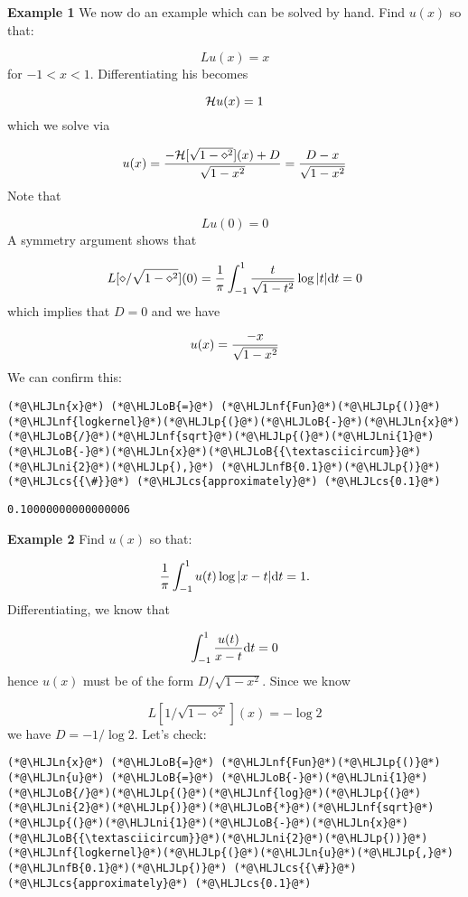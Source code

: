 \documentclass[12pt,landscape]{article}
\newcommand{\HLJLn}[1]{#1}
\newcommand{\HLJLnf}[1]{\textcolor[RGB]{66,102,213}{#1}}
\newcommand{\HLJLnfB}[1]{\textcolor[RGB]{59,151,46}{#1}}
\newcommand{\HLJLni}[1]{\textcolor[RGB]{59,151,46}{#1}}
\newcommand{\HLJLoB}[1]{\textcolor[RGB]{102,102,102}{\textbf{#1}}}
\newcommand{\HLJLp}[1]{#1}
\newcommand{\HLJLcs}[1]{\textcolor[RGB]{153,153,119}{\textit{#1}}}
\def\D{ {\rm d} }
\def\HH{ {\cal H} }
\def\dt{\D t}
\begin{document}
{\textbf{Example 1} We now do an example which can be solved by hand. Find $u(x)$ so that:

\[
L u(x) = x
\]
for $-1 < x < 1$. Differentiating his becomes

\[
\HH u(x) = 1
\]
which we solve via

\[
u(x) = {- \HH[\sqrt{1-\diamond^2}](x) + D \over \sqrt{1-x^2}} = {D-x \over \sqrt{1-x^2}}
\]
Note that

\[
L u(0) = 0
\]
A symmetry argument shows that

\[
L [\diamond/\sqrt{1-\diamond^2}](0) = {1 \over \pi} \int_{-1}^1 {t \over \sqrt{1-t^2}} \log|t| \D t = 0
\]
which implies that $D = 0$ and we have

\[
u(x) = {-x \over \sqrt{1-x^2}}
\]
We can confirm this:


\begin{lstlisting}
(*@\HLJLn{x}@*) (*@\HLJLoB{=}@*) (*@\HLJLnf{Fun}@*)(*@\HLJLp{()}@*)
(*@\HLJLnf{logkernel}@*)(*@\HLJLp{(}@*)(*@\HLJLoB{-}@*)(*@\HLJLn{x}@*)(*@\HLJLoB{/}@*)(*@\HLJLnf{sqrt}@*)(*@\HLJLp{(}@*)(*@\HLJLni{1}@*)(*@\HLJLoB{-}@*)(*@\HLJLn{x}@*)(*@\HLJLoB{{\textasciicircum}}@*)(*@\HLJLni{2}@*)(*@\HLJLp{),}@*) (*@\HLJLnfB{0.1}@*)(*@\HLJLp{)}@*) (*@\HLJLcs{{\#}}@*) (*@\HLJLcs{approximately}@*) (*@\HLJLcs{0.1}@*)
\end{lstlisting}

\begin{lstlisting}
0.10000000000000006
\end{lstlisting}


\textbf{Example 2} Find $u(x)$ so that:

\[
{1 \over \pi} \int_{-1}^1 u(t) \log | x-t| \dt = 1.
\]
Differentiating, we know that

\[
\int_{-1}^1 {u(t) \over x-t} \dt = 0
\]
hence $u(x)$ must be of the form ${D / \sqrt{1-x^2}}$.  Since we know

\[
L[{1 /\sqrt{1-\diamond^2}}](x) = - \log 2
\]
we have $D = -1/\log 2$. Let's check:


\begin{lstlisting}
(*@\HLJLn{x}@*) (*@\HLJLoB{=}@*) (*@\HLJLnf{Fun}@*)(*@\HLJLp{()}@*)
(*@\HLJLn{u}@*) (*@\HLJLoB{=}@*) (*@\HLJLoB{-}@*)(*@\HLJLni{1}@*)(*@\HLJLoB{/}@*)(*@\HLJLp{(}@*)(*@\HLJLnf{log}@*)(*@\HLJLp{(}@*)(*@\HLJLni{2}@*)(*@\HLJLp{)}@*)(*@\HLJLoB{*}@*)(*@\HLJLnf{sqrt}@*)(*@\HLJLp{(}@*)(*@\HLJLni{1}@*)(*@\HLJLoB{-}@*)(*@\HLJLn{x}@*)(*@\HLJLoB{{\textasciicircum}}@*)(*@\HLJLni{2}@*)(*@\HLJLp{))}@*)
(*@\HLJLnf{logkernel}@*)(*@\HLJLp{(}@*)(*@\HLJLn{u}@*)(*@\HLJLp{,}@*) (*@\HLJLnfB{0.1}@*)(*@\HLJLp{)}@*) (*@\HLJLcs{{\#}}@*) (*@\HLJLcs{approximately}@*) (*@\HLJLcs{0.1}@*)
\end{lstlisting}

}
\end{document}
